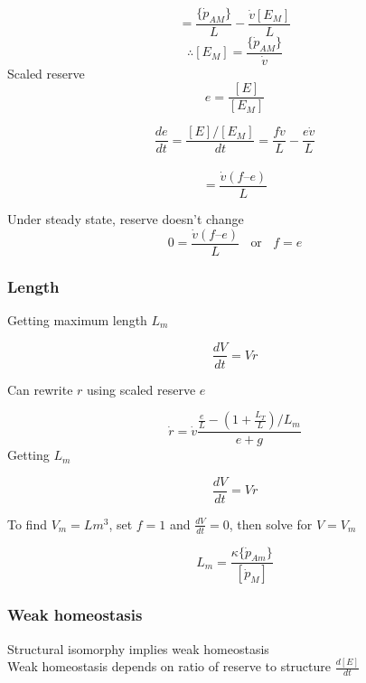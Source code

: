 \documentclass[10,portrait]{article}
\begin{document}
\[
= \frac
  {\{\dot{p}_{AM}\}}
  {L} - 
  \frac
  {\dot{v}[E_{M}]}
  {L}    
\] \[
\therefore 
[E_{M}]
= \frac
  {\{\dot{p}_{AM}\}}
  {\dot{v}}
\] Scaled reserve \[
e =
\frac
{[E]}
{[E_{M}]}  
\]

\[
\frac
{de}
{dt}
= \frac
{[E] /[E_{M}]}
{dt} 
= \frac
{f\dot{v}}
{L}  - 
\frac
{e\dot{v}}
{L}     
\]\\
\[
= \frac
{\dot{v} (f – e)}
{L} 
\]

Under steady state, reserve doesn't change\\
\[
0 =
\frac
{\dot{v} (f – e)}
{L}
\ \ \ \
\text{or}
\ \ \ \ f = e
\]

\subsubsection{Length}\label{length}

Getting maximum length \(L_{m}\)

\[
\frac
{dV}
{dt}
= V\dot{r}  
\]

Can rewrite \(r\) using scaled reserve \(e\)

\[
\dot{r} = 
\dot{v}
\frac
{\frac
{e}
{L} - 
(1 + \frac
{L_{T}} 
{L}
) /
{L_{m}}}
{e + g}
\] Getting \(L_{m}\)

\[
\frac
{dV}
{dt} = 
V\dot{r}
\]

To find \(V_{m} = Lm^{3}\), set \(f = 1\) and \(\frac{dV}{dt} = 0\),
then solve for \(V = V_{m}\)

\[
L_{m}
=
\frac
{\kappa\{\dot{p}_{Am}\}}
{[\dot{p}_{M}]}
\]

\subsubsection{Weak homeostasis}\label{weak-homeostasis}

Structural isomorphy implies weak homeostasis\\
Weak homeostasis depends on ratio of reserve to structure
\(\frac{d[E]}{dt}\)

\printbibliography
\end{document}
